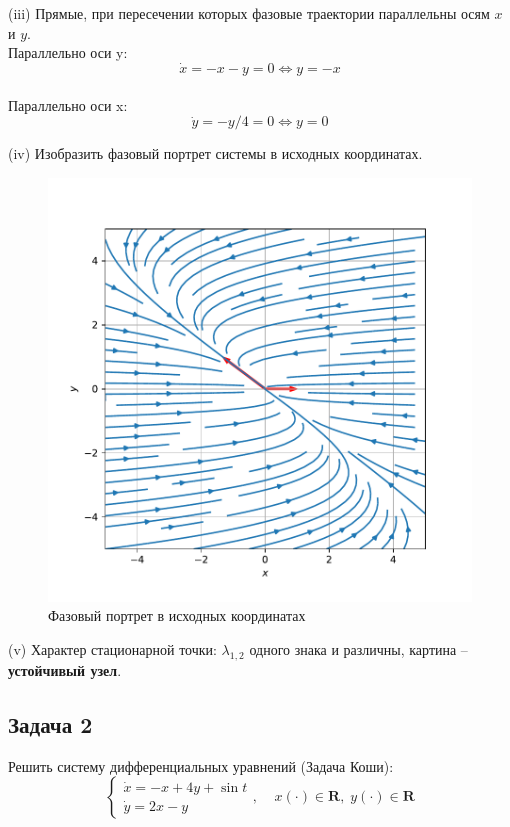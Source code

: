 \documentclass[a4paper, 12pt]{article}
\begin{document}
(iii) Прямые, при пересечении которых фазовые траектории параллельны осям $x$ и $y$.\\
Параллельно оси y:
\[\dot{x} = -x-y=0\Leftrightarrow y = -x\]\\
Параллельно оси x:
\[\dot{y} = -y/4=0\Leftrightarrow y = 0\]




(iv) Изобразить фазовый портрет системы в исходных координатах.

\begin{figure}[H]
	\centering
	\includegraphics[scale=0.7]{2b1_1}
	\caption{Фазовый портрет в исходных координатах}
	\label{im:1b1_1}
\end{figure}

(v) Характер стационарной точки: $\lambda_{1,2}$ одного знака и различны, картина -- \textbf{устойчивый узел}.

	\subsection {Задача 2}
 Решить систему дифференциальных уравнений (Задача Коши): 
\begin{equation}
\left\{
\begin{array}{lr}
\dot{x} = -x+4y+\sin{t}\\
\dot{y} = 2x-y
\end{array}
\right.
, \;\;\;\; x(\cdot)\in \textbf{R},\; y(\cdot)\in \textbf{R}
\label{eq:30}
\end{equation}
\end{document}

